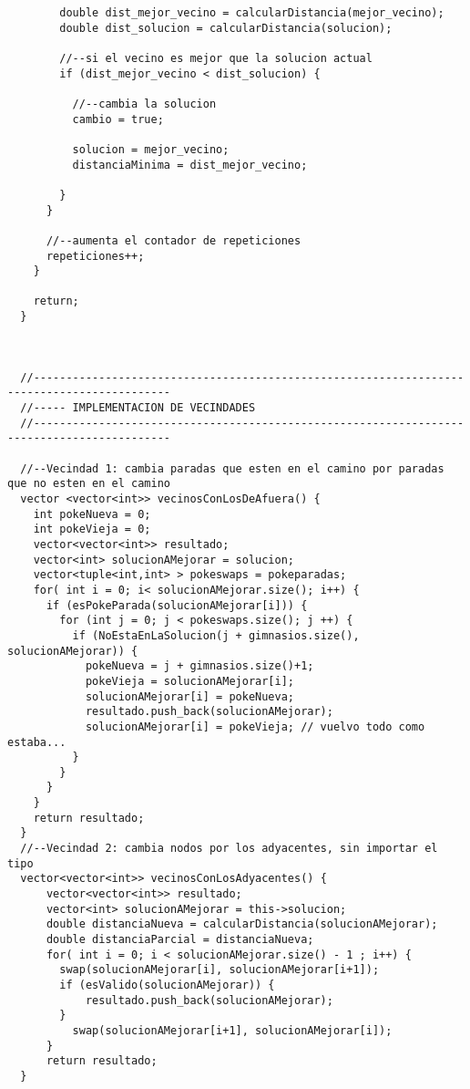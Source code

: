 \begin{lstlisting}
        double dist_mejor_vecino = calcularDistancia(mejor_vecino);
        double dist_solucion = calcularDistancia(solucion);

        //--si el vecino es mejor que la solucion actual
        if (dist_mejor_vecino < dist_solucion) {

          //--cambia la solucion
          cambio = true;

          solucion = mejor_vecino;
          distanciaMinima = dist_mejor_vecino;

        }
      }

      //--aumenta el contador de repeticiones
      repeticiones++;
    }

    return;
  }



  //-------------------------------------------------------------------------------------------
  //----- IMPLEMENTACION DE VECINDADES
  //-------------------------------------------------------------------------------------------

  //--Vecindad 1: cambia paradas que esten en el camino por paradas que no esten en el camino
  vector <vector<int>> vecinosConLosDeAfuera() {
    int pokeNueva = 0;
    int pokeVieja = 0;
    vector<vector<int>> resultado;
    vector<int> solucionAMejorar = solucion;
    vector<tuple<int,int> > pokeswaps = pokeparadas;
    for( int i = 0; i< solucionAMejorar.size(); i++) {
      if (esPokeParada(solucionAMejorar[i])) {
        for (int j = 0; j < pokeswaps.size(); j ++) {
          if (NoEstaEnLaSolucion(j + gimnasios.size(), solucionAMejorar)) {
            pokeNueva = j + gimnasios.size()+1;
            pokeVieja = solucionAMejorar[i];
            solucionAMejorar[i] = pokeNueva;
            resultado.push_back(solucionAMejorar);
            solucionAMejorar[i] = pokeVieja; // vuelvo todo como estaba...
          }
        }
      }
    }
    return resultado;
  }
  //--Vecindad 2: cambia nodos por los adyacentes, sin importar el tipo
  vector<vector<int>> vecinosConLosAdyacentes() {
      vector<vector<int>> resultado;
      vector<int> solucionAMejorar = this->solucion;
      double distanciaNueva = calcularDistancia(solucionAMejorar);
      double distanciaParcial = distanciaNueva;
      for( int i = 0; i < solucionAMejorar.size() - 1 ; i++) {
        swap(solucionAMejorar[i], solucionAMejorar[i+1]);
        if (esValido(solucionAMejorar)) {
            resultado.push_back(solucionAMejorar);
        }
          swap(solucionAMejorar[i+1], solucionAMejorar[i]);
      }
      return resultado;
  }


\end{lstlisting}
